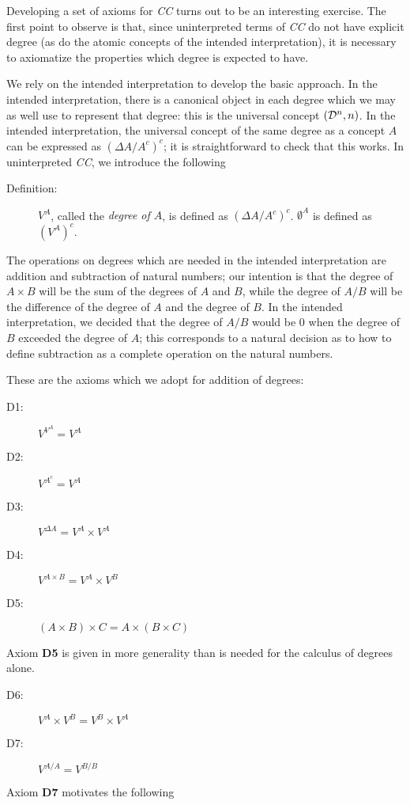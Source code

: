 Developing a set of axioms for {\em CC\/} turns out to be an
interesting exercise.  The first point to observe is that, since
uninterpreted terms of {\em CC\/} do not have explicit degree (as do
the atomic concepts of the intended interpretation), it is necessary
to axiomatize the properties which degree is expected to have.

We rely on the intended interpretation to develop the basic approach.
In the intended interpretation, there is a canonical object in each
degree which we may as well use to represent that degree: this is the
universal concept $({\cal D}^n,n)$.  In the intended interpretation,
the universal concept of the same degree as a concept $A$ can be
expressed as $(\Delta A/A^c)^c$; it is straightforward to check that
this works.  In uninterpreted {\em CC\/}, we introduce the following

\begin{description}
\item[Definition:]  

$V^A$, called the {\em degree of $A$\/}, is defined as $(\Delta
A/A^c)^c$.  $\emptyset^A$ is defined as $(V^A)^c$.

\end{description}

The operations on degrees which are needed in the intended
interpretation are addition and subtraction of natural numbers; our
intention is that the degree of $A \times B$ will be the sum of the
degrees of $A$ and $B$, while the degree of $A/B$ will be the
difference of the degree of $A$ and the degree of $B$.  In the
intended interpretation, we decided that the degree of $A/B$ would be
0 when the degree of $B$ exceeded the degree of $A$; this corresponds
to a natural decision as to how to define subtraction as a complete
operation on the natural numbers.

These are the axioms which we adopt for addition of degrees:


\begin{description}


\item[D1:]  $V^{V^A} = V^A$

\item[D2:]  $V^{A^c} = V^A$

\item[D3:]  $V^{\Delta A} = V^A \times V^A$

\item[D4:]  $V^{A \times B} = V^A \times V^B$

\item[D5:]  $(A \times B) \times C = A \times (B \times C)$
\end{description}
Axiom {\bf D5} is given in more generality than is needed for the
calculus of degrees alone.
\begin{description}

\item[D6:]  $V^A \times V^B = V^B \times V^A$

\item[D7:]  $V^{A/A} = V^{B/B}$

\end{description}
Axiom {\bf D7} motivates the following

